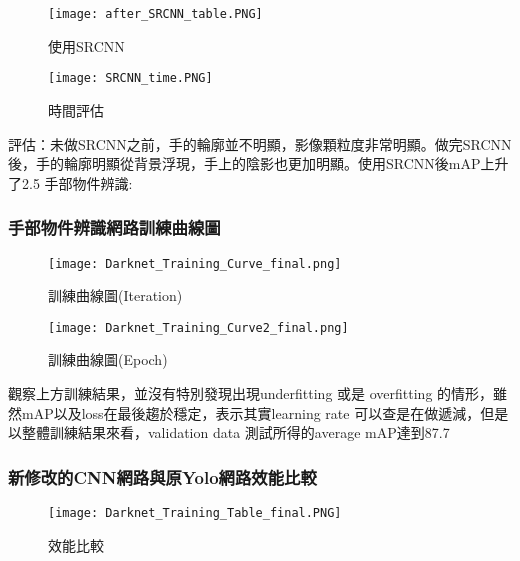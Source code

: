 \begin{figure}[H]
    \centering
    \texttt{[image: after\_SRCNN\_table.PNG]}
    \caption{使用SRCNN}
    \label{fig:使用SRCNN}
\end{figure}

\begin{figure}[H]
    \centering
    \texttt{[image: SRCNN\_time.PNG]}
    \caption{時間評估}
    \label{時間評估}
\end{figure}


評估：未做SRCNN之前，手的輪廓並不明顯，影像顆粒度非常明顯。做完SRCNN後，手的輪廓明顯從背景浮現，手上的陰影也更加明顯。使用SRCNN後mAP上升了2.5%
手部物件辨識:

\subsubsection{手部物件辨識網路訓練曲線圖}

\begin{figure}[H]
    \centering
    \texttt{[image: Darknet\_Training\_Curve\_final.png]}
    \caption{訓練曲線圖(Iteration)}
    \label{fig:訓練曲線圖(Iteration)}
\end{figure}

\begin{figure}[H]
    \centering
    \texttt{[image: Darknet\_Training\_Curve2\_final.png]}
    \caption{訓練曲線圖(Epoch)}
    \label{fig:訓練曲線圖(Epoch)}
\end{figure}


觀察上方訓練結果，並沒有特別發現出現underfitting 或是 overfitting 的情形，雖然mAP以及loss在最後趨於穩定，表示其實learning rate 可以查是在做遞減，但是以整體訓練結果來看，validation data 測試所得的average mAP達到87.7%

\subsubsection{新修改的CNN網路與原Yolo網路效能比較}

\begin{figure}[H]
    \centering
    \texttt{[image: Darknet\_Training\_Table\_final.PNG]}
    \caption{效能比較}
    \label{fig:效能比較}
\end{figure}




